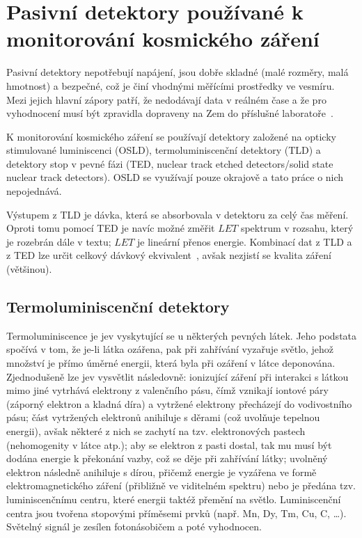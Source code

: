 \chapter{Pasivní detektory používané k monitorování kosmického záření}\label{sec:detektory_detektory}
Pasivní detektory nepotřebují napájení, jsou dobře skladné (malé rozměry, malá hmotnost) a bezpečné, což je činí vhodnými měřícími prostředky ve vesmíru. Mezi jejich hlavní zápory patří, že nedodávají data v reálném čase a že pro vyhodnocení musí být zpravidla dopraveny na Zem do příslušné laboratoře~\cite{benton}.

K monitorování kosmického záření se používají detektory založené na opticky stimulované luminiscenci (OSLD), termoluminiscenční detektory (TLD) a detektory stop v pevné fázi (TED, nuclear track etched detectors/solid state nuclear track detectors). OSLD se využívají pouze okrajově a tato práce o nich nepojednává.

Výstupem z TLD je dávka, která se absorbovala v detektoru za celý čas měření. Oproti tomu pomocí TED je navíc možné změřit $\mathit{LET}$ spektrum v rozsahu, který je rozebrán dále v textu; $\mathit{LET}$ je lineární přenos energie. Kombinací dat z TLD a z TED lze určit celkový dávkový ekvivalent~\cite{benton}, avšak nezjistí se kvalita záření (většinou).
\section{Termoluminiscenční detektory}\label{sec:detektory_TLD}
Termoluminiscence je jev vyskytující se u některých pevných látek. Jeho podstata spočívá v tom, že je-li látka ozářena, pak při zahřívání vyzařuje světlo, jehož množství je přímo úměrné energii, která byla při ozáření v látce deponována. Zjednodušeně lze jev vysvětlit následovně: ionizující záření při interakci s látkou mimo jiné vytrhává elektrony z valenčního pásu, čímž vznikají iontové páry (záporný elektron a kladná díra) a vytržené elektrony přecházejí do vodivostního pásu; část vytržených elektronů anihiluje s děrami (což uvolňuje tepelnou energii), avšak některé z nich se zachytí na tzv. elektronových pastech (nehomogenity v látce atp.); aby se elektron z pasti dostal, tak mu musí být dodána energie k překonání vazby, což se děje při zahřívání látky; uvolněný elektron následně
anihiluje s dírou, přičemž energie je vyzářena ve formě elektromagnetického záření (přibližně ve viditelném spektru) nebo je předána tzv. luminiscenčnímu centru, které energii taktéž přemění na světlo. Luminiscenční centra jsou tvořena stopovými příměsemi prvků (např. Mn, Dy, Tm, Cu, C, \ldots). Světelný signál je zesílen fotonásobičem a poté vyhodnocen.

